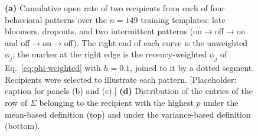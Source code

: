 \begin{figure}[t]
\centering
{}\hfill
{}\hfill
{}\hfill
{}
\caption{\textbf{(a)} Cumulative open rate of two recipients from each of four
behavioral patterns over the $n=149$ training templates: late bloomers,
dropouts, and two intermittent patterns (on$\to$off$\to$on and
off$\to$on$\to$off). The right end of each curve is the unweighted $\phi_j$;
the marker at the right edge is the recency-weighted $\phi_j$ of
Eq.~\eqref{eq:phi-weighted} with $h=0.1$, joined to it by a dotted segment.
Recipients were selected to illustrate each pattern.
[Placeholder: caption for panels (b) and (c).]
\textbf{(d)} Distribution of the entries of the row of $\Sigma$ belonging to the
recipient with the highest $p$ under the mean-based definition (top) and under
the variance-based definition (bottom).}
\label{fig:drift-sigma}
\end{figure}
